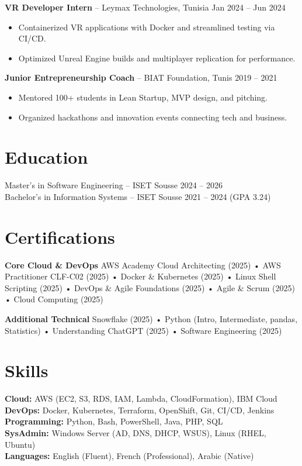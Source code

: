 \documentclass[a4paper,10pt]{article}
\begin{document}
\textbf{VR Developer Intern} – Leymax Technologies, Tunisia \hfill Jan 2024 -- Jun 2024
\begin{itemize}
    \item Containerized VR applications with Docker and streamlined testing via CI/CD.
    \item Optimized Unreal Engine builds and multiplayer replication for performance.
\end{itemize}

\textbf{Junior Entrepreneurship Coach} – BIAT Foundation, Tunis \hfill 2019 -- 2021
\begin{itemize}
    \item Mentored 100+ students in Lean Startup, MVP design, and pitching.
    \item Organized hackathons and innovation events connecting tech and business.
\end{itemize}

\section*{Education}
Master’s in Software Engineering – ISET Sousse \hfill 2024 -- 2026 \\
Bachelor’s in Information Systems – ISET Sousse \hfill 2021 -- 2024 (GPA 3.24)

\section*{Certifications}
\textbf{Core Cloud \& DevOps}  
AWS Academy Cloud Architecting (2025) • AWS Practitioner CLF-C02 (2025) • Docker \& Kubernetes (2025) • Linux Shell Scripting (2025) • DevOps \& Agile Foundations (2025) • Agile \& Scrum (2025) • Cloud Computing (2025)  

\textbf{Additional Technical}  
Snowflake (2025) • Python (Intro, Intermediate, pandas, Statistics) • Understanding ChatGPT (2025) • Software Engineering (2025)

\section*{Skills}
\textbf{Cloud:} AWS (EC2, S3, RDS, IAM, Lambda, CloudFormation), IBM Cloud \\
\textbf{DevOps:} Docker, Kubernetes, Terraform, OpenShift, Git, CI/CD, Jenkins \\
\textbf{Programming:} Python, Bash, PowerShell, Java, PHP, SQL \\
\textbf{SysAdmin:} Windows Server (AD, DNS, DHCP, WSUS), Linux (RHEL, Ubuntu) \\
\textbf{Languages:} English (Fluent), French (Professional), Arabic (Native)
\end{document}
